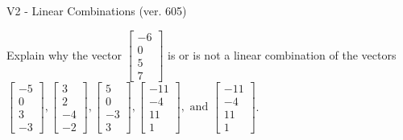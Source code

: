 \begin{exercise}
  \begin{exerciseTitle}V2 - Linear Combinations (ver. 605)\end{exerciseTitle}
  \begin{exerciseStatement}
    Explain why the vector \(\left[\begin{array}{c}
-6 \\
0 \\
5 \\
7
\end{array}\right]\)  is or is not a linear 
	combination of the vectors \(\left[\begin{array}{c}
-5 \\
0 \\
3 \\
-3
\end{array}\right] , \left[\begin{array}{c}
3 \\
2 \\
-4 \\
-2
\end{array}\right] , \left[\begin{array}{c}
5 \\
0 \\
-3 \\
3
\end{array}\right] , \left[\begin{array}{c}
-11 \\
-4 \\
11 \\
1
\end{array}\right] , \text{ and } \left[\begin{array}{c}
-11 \\
-4 \\
11 \\
1
\end{array}\right]\).
	



\end{exerciseStatement}
\end{exercise}
